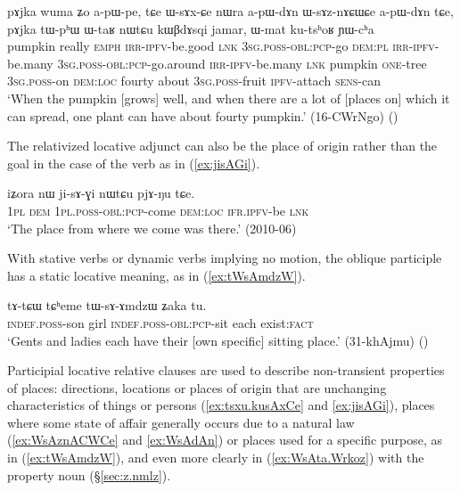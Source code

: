 \begin{exe}
\ex \label{ex:WsAznACWCe}
\gll  pɤjka wuma ʑo a-pɯ-pe, tɕe ɯ-sɤx-ɕe nɯra a-pɯ-dɤn ɯ-sɤz-nɤɕɯɕe a-pɯ-dɤn tɕe, pɤjka tɯ-pʰɯ ɯ-taʁ nɯtɕu kɯβdɤsqi jamar, ɯ-mat ku-tsʰoʁ ɲɯ-cʰa \\
pumpkin really \textsc{emph} \textsc{irr}-\textsc{ipfv}-be.good \textsc{lnk} \textsc{3sg}.\textsc{poss}-\textsc{obl}:\textsc{pcp}-go \textsc{dem}:\textsc{pl} \textsc{irr}-\textsc{ipfv}-be.many \textsc{3sg}.\textsc{poss}-\textsc{obl}:\textsc{pcp}-go.around \textsc{irr}-\textsc{ipfv}-be.many  \textsc{lnk} pumpkin \textsc{one}-tree \textsc{3sg}.\textsc{poss}-on \textsc{dem}:\textsc{loc} fourty about \textsc{3sg}.\textsc{poss}-fruit \textsc{ipfv}-attach \textsc{sens}-can \\
\glt `When the pumpkin [grows] well, and when there are a lot of [places on] which it can spread, one plant can have about fourty pumpkin.' (16-CWrNgo)
()
\end{exe}

The relativized locative adjunct can also be the place of origin rather than the goal in the case of the verb  as in (\ref{ex:jisAGi}).

\begin{exe}
\ex \label{ex:jisAGi}
\gll  iʑora nɯ ji-sɤ-ɣi nɯtɕu pjɤ-ŋu tɕe. \\
\textsc{1pl} \textsc{dem} \textsc{1pl}.\textsc{poss}-\textsc{obl}:\textsc{pcp}-come \textsc{dem}:\textsc{loc} \textsc{ifr}.\textsc{ipfv}-be \textsc{lnk} \\
\glt  `The place from where we come was there.' (2010-06)
\end{exe}

With stative verbs or dynamic verbs implying no motion, the oblique participle has a static locative meaning, as in  (\ref{ex:tWsAmdzW}).
 

\begin{exe}
\ex \label{ex:tWsAmdzW}
\gll tɤ-tɕɯ tɕʰeme tɯ-sɤ-ɤmdzɯ ʑaka tu. \\
\textsc{indef}.\textsc{poss}-son girl \textsc{indef}.\textsc{poss}-\textsc{obl}:\textsc{pcp}-sit each exist:\textsc{fact} \\ 
\glt `Gents and ladies each have their [own specific] sitting place.' (31-khAjmu)
()
\end{exe}


Participial locative relative clauses are used to describe non-transient properties of places: directions, locations or places of origin that are unchanging characteristics of things or persons (\ref{ex:tsxu.kusAxCe} and \ref{ex:jisAGi}), places where some state of affair generally occurs due to a natural law (\ref{ex:WsAznACWCe} and \ref{ex:WsAdAn}) or places used for a specific purpose, as in (\ref{ex:tWsAmdzW}), and even more clearly in (\ref{ex:WsAta.Wrkoz}) with the property noun    (§\ref{sec:z.nmlz}).

